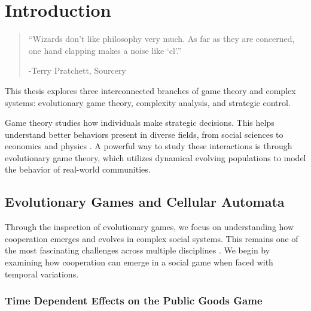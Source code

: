 \chapter{Introduction}
\label{chap:Intro}

\begin{quotation}

\vspace{-3cm}

\begin{flushright}
\begin{minipage}[t][5cm][b]{0.5\textwidth}
{ ``Wizards don’t like philosophy very much. As far as they are concerned, one hand clapping makes a noise like `cl'.''}

\bigskip

-{\small  Terry Pratchett, Sourcery }
\end{minipage}
\end{flushright}

\vspace{0.5cm}

\end{quotation}



This thesis explores three interconnected branches of game theory and complex systems: evolutionary game theory, complexity analysis, and strategic control. 

Game theory studies how individuals make strategic decisions. This helps understand better behaviors present in diverse fields, from social sciences to economics and physics \cite{Social,EconomyGames,GamesComplex}. A powerful way to study these interactions is through evolutionary game theory, which utilizes dynamical evolving populations to model the behavior of real-world communities. 

\section{Evolutionary Games and Cellular Automata}

Through the inspection of evolutionary games, we focus on understanding how cooperation emerges and evolves in complex social systems. This remains one of the most fascinating challenges across multiple disciplines \cite{SocialPhy}. We begin by examining how cooperation can emerge in a social game when faced with temporal variations. 

\subsection{Time Dependent Effects on the Public Goods Game}

